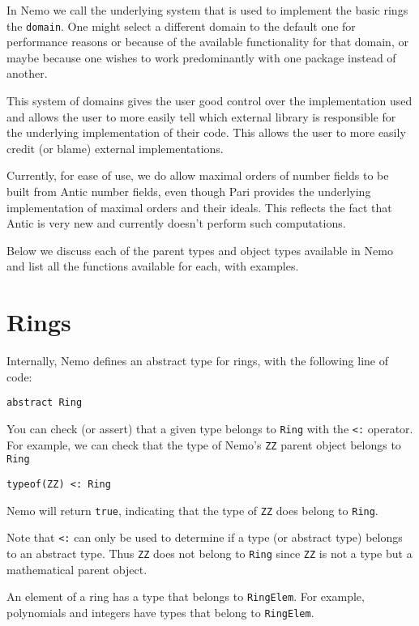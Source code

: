 \documentclass[a4paper,10pt]{article}
\newcommand{\code}{\lstinline}
\begin{document}
In Nemo we call the underlying system that is used to implement the basic rings the \code{domain}. One
might select a different domain to the default one for performance reasons or because of the available
functionality for that domain, or maybe because one wishes to work predominantly with one package
instead of another. 

This system of domains gives the user good control over the implementation used and allows the user to
more easily tell which external library is responsible for the underlying implementation of their code.
This allows the user to more easily credit (or blame) external implementations.

Currently, for ease of use, we do allow maximal orders of number fields to be built from Antic number
fields, even though Pari provides the underlying implementation of maximal orders and their ideals. This
reflects the fact that Antic is very new and currently doesn't perform such computations.

Below we discuss each of the parent types and object types available in Nemo and list all the functions
available for each, with examples.

\section{Rings}

Internally, Nemo defines an abstract type for rings, with the following line of code:

\begin{lstlisting}
abstract Ring
\end{lstlisting}

You can check (or assert) that a given type belongs to \code{Ring} with the
\code{<:} operator. For example, we can check that the type of Nemo's \code{ZZ} parent object belongs
to \code{Ring}

\begin{lstlisting}
typeof(ZZ) <: Ring
\end{lstlisting}

Nemo will return \code{true}, indicating that the type of \code{ZZ} does belong to \code{Ring}.

Note that \code{<:} can only be used to determine if a type (or abstract type) belongs to an abstract
type. Thus \code{ZZ} does not belong to \code{Ring} since \code{ZZ} is not a type but a mathematical
parent object.

An element of a ring has a type that belongs to \code{RingElem}. For example, polynomials and integers
have types that belong to \code{RingElem}.
\end{document}
